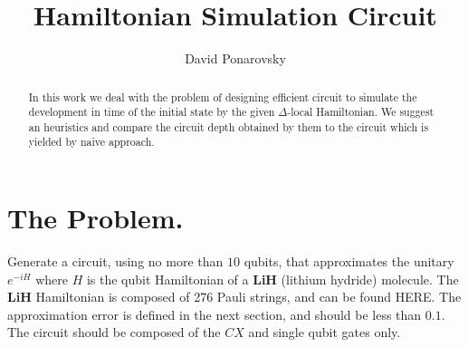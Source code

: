 \documentclass{article}
\begin{document}
\newcommand{\commentt}[1]{\textcolor{blue}{ \textbf{[COMMENT]} #1}}
\newcommand{\ctt}[1]{\commentt{#1}}
\newcommand{\prb}[1]{ \mathbf{Pr} \left[ {#1} \right]}
\newcommand{\expp}[1]{ \mathbf{E} \left[ {#1} \right]}
\newcommand{\onotation}[1]{\(\mathcal{O} \left( {#1}  \right) \)}
\newcommand{\ona}[1]{\onotation{#1}}
\newcommand{\PSI}{{\ket{\psi}}}
\newcommand{\LESn}{\ket{\psi_n}}
\newcommand{\LESa}{\ket{\phi_n}}
\newcommand{\LESs}{\frac{1}{\sqrt{n}}\sum_{i}{\ket{\left(0^{i}10^{n-i}\right)^{n}}}}
\newcommand{\Hn}{\mathcal{H}_{n}}

\newcommand{\Ep}{\frac{1}{\sqrt{2^n}}\sum^{2^n}_{x}{ \ket{xx}}}
\newcommand{\HON}{\ket{\psi_{\text{honest}}}}



\title{Hamiltonian Simulation Circuit}
\author{David Ponarovsky}
\maketitle

\begin{abstract}
  In this work we deal with the problem of designing efficient circuit to simulate the development in time of the initial state by the given $\Delta$-local Hamiltonian. We suggest an heuristics and compare the circuit depth obtained by them to the circuit which is yielded by naive approach.  
\end{abstract}


\section{The Problem.}
Generate a circuit, using no more than \(10\) qubits, that approximates the unitary \(e^{-iH}\) where \(H\) is the qubit Hamiltonian of a \textbf{LiH} (lithium hydride) molecule. The \textbf{LiH} Hamiltonian is composed of 276 Pauli strings, and can be found HERE. The approximation error is defined in the next section, and should be less than \(0.1\). The circuit should be composed of the \(CX\) and single qubit gates only.
\end{document}
